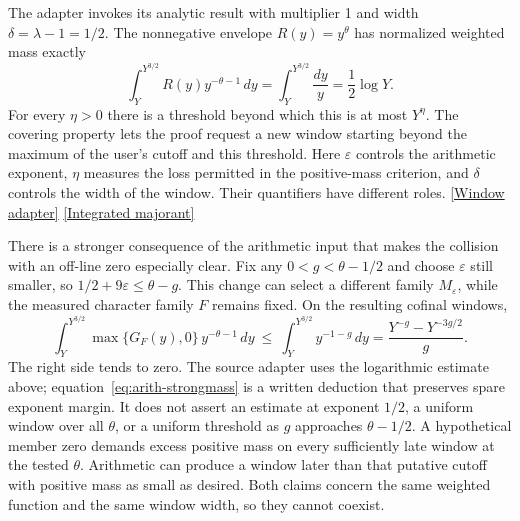 \documentclass[12pt,letterpaper]{article}
\begin{document}
The adapter invokes its analytic result with multiplier 1 and width \(\delta=\lambda-1=1/2\). The nonnegative envelope \(R(y)=y^\theta\) has normalized weighted mass exactly
\[
       \int_Y^{Y^{3/2}} R(y)y^{-\theta-1}\,dy
             =\int_Y^{Y^{3/2}}\frac{dy}{y}
             =\frac12\log Y .
\]
For every \(\eta>0\) there is a threshold beyond which this is at most \(Y^\eta\). The covering property lets the proof request a new window starting beyond the maximum of the user's cutoff and this threshold. Here \(\varepsilon\) controls the arithmetic exponent, \(\eta\) measures the loss permitted in the positive-mass criterion, and \(\delta\) controls the width of the window. Their quantifiers have different roles. \href{https://github.com/nousentllc/riemann-hypothesis/blob/40e56bab026552e089d7afcfeff08d2defb9c005/src/Development/AutomorphicArithmetic/PrimitiveCosets/Imports.lean#L8-L19}{\textsf{[Window adapter]}} \href{https://github.com/nousentllc/riemann-hypothesis/blob/40e56bab026552e089d7afcfeff08d2defb9c005/src/Development/AutomorphicArithmetic/DedekindLFunctions/LandauTheorems/WindowHypOfRpow.lean#L31-L57}{\textsf{[Integrated majorant]}}

There is a stronger consequence of the arithmetic input that makes the collision with an off-line zero especially clear. Fix any \(0<g<\theta-1/2\) and choose \(\varepsilon\) still smaller, so \(1/2+9\varepsilon\le\theta-g\). This change can select a different family \(M_\varepsilon\), while the measured character family \(F\) remains fixed. On the resulting cofinal windows,
\begin{equation}
 \int_Y^{Y^{3/2}}\max\{G_F(y),0\}\,y^{-\theta-1}\,dy
       \ \le\ \int_Y^{Y^{3/2}} y^{-1-g}\,dy
       =\frac{Y^{-g}-Y^{-3g/2}}{g}.
 \label{eq:arith-strongmass}
\end{equation}
The right side tends to zero. The source adapter uses the logarithmic estimate above; equation~\eqref{eq:arith-strongmass} is a written deduction that preserves spare exponent margin. It does not assert an estimate at exponent \(1/2\), a uniform window over all \(\theta\), or a uniform threshold as \(g\) approaches \(\theta-1/2\). A hypothetical member zero demands excess positive mass on every sufficiently late window at the tested \(\theta\). Arithmetic can produce a window later than that putative cutoff with positive mass as small as desired. Both claims concern the same weighted function and the same window width, so they cannot coexist.
\end{document}
